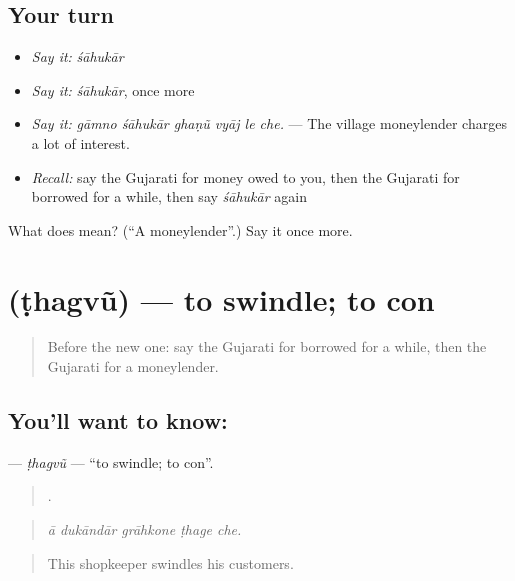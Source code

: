 \subsection*{Your turn}
\begin{itemize}
\raggedright
  \item \emph{Say it:} \emph{śāhukār}
  \item \emph{Say it:} \emph{śāhukār}, once more
  \item \emph{Say it:} \emph{gāmno śāhukār ghaṇũ vyāj le che.} — The village moneylender charges a lot of interest.
  \item \emph{Recall:} say the Gujarati for money owed to you, then the Gujarati for borrowed for a while, then say \emph{śāhukār} again
\end{itemize}

\begin{tcolorbox}[breakable,colback=teal!4,colframe=teal!35!black,title={Before you move on}]
What does  mean? (\textquotedblleft{}A moneylender\textquotedblright{}.) Say it once more.
\end{tcolorbox}
\section[\texorpdfstring{\gu{ઠગવું} (ṭhagvũ)}{ઠગવું (ṭhagvũ)}]{ (ṭhagvũ) — to swindle; to con}

\label{lesson:GU-C428-thagvu}



\begin{quote}
Before the new one: say the Gujarati for borrowed for a while, then the Gujarati for a moneylender.
\end{quote}

\subsection*{You'll want to know: }
\textbf{} — \emph{ṭhagvũ} — \textquotedblleft{}to swindle; to con\textquotedblright{}.

\begin{quote}
    .
\end{quote}

\begin{quote}
\emph{ā dukāndār grāhkone ṭhage che.}
\end{quote}

\begin{quote}
This shopkeeper swindles his customers.
\end{quote}

